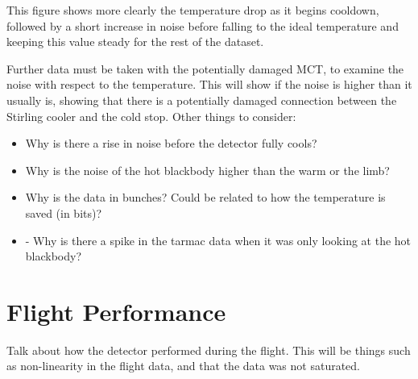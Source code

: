 This figure shows more clearly the temperature drop as it begins cooldown, followed by a short increase in noise before falling to the ideal temperature and keeping this value steady for the rest of the dataset.

Further data must be taken with the potentially damaged MCT, to examine the noise with respect to the temperature. This will show if the noise is higher than it usually is, showing that there is a potentially damaged connection between the Stirling cooler and the cold stop. Other things to consider:
\begin{itemize}
    \item Why is there a rise in noise before the detector fully cools?
    \item Why is the noise of the hot blackbody higher than the warm or the limb?
    \item Why is the data in bunches? Could be related to how the temperature is saved (in bits)?
    \item -	Why is there a spike in the tarmac data when it was only looking at the hot blackbody?
\end{itemize}

\section{Flight Performance}
Talk about how the detector performed during the flight. This will be things such as non-linearity in the flight data, and that the data was not saturated.